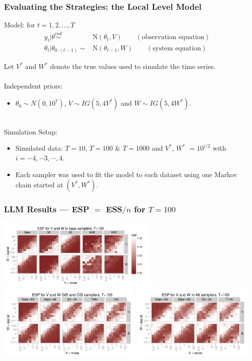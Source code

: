 \documentclass[xcolor=dvipsnames]{beamer}
\newcommand\N{\mathrm{N}}
\begin{document}
\begin{frame}[fragile]
\frametitle{Evaluating the Strategies: the Local Level Model}
Model: for $t=1,2,...,T$
\begin{align*}
    y_t|\theta  \stackrel{ind}{\sim}&\N(\theta_t,V) \qquad (\mbox{observation equation})\\
    \theta_t|\theta_{0:(t-1)} \sim& \N(\theta_{t-1},W) \qquad (\mbox{system equation})
  \end{align*} 

Let $V^*$ and $W^*$ denote the true values used to simulate the time series.\\~\\

Independent priors:
\begin{itemize}
\item $\theta_0\sim N(0, 10^7)$, $V\sim IG(5, 4V^*)$ and $W\sim IG(5, 4W^*)$.\\~\\
\end{itemize}

Simulation Setup:
\begin{itemize}
\item Simulated data: $T=10$, $T=100$ \& $T=1000$ and $V^*$, $W^*$ $=10^{i/2}$ with $i=-4,-3,\cdots,4$.
\item Each sampler was used to fit the model to each dataset using one Markov chain started at $(V^*,W^*)$.
\end{itemize}


\end{frame}

\begin{frame}
\frametitle{LLM Results --- ESP $=$ ESS$/n$ for $T=100$}
\centering
\includegraphics[width=0.59\textwidth]{../../doc/plots/basecisESplot100}\\
\includegraphics[width=0.53\textwidth]{../../doc/plots/altintESplotV100}
\includegraphics[width=0.45\textwidth]{../../doc/plots/altintESplotW100}
\end{frame}
\end{document}
